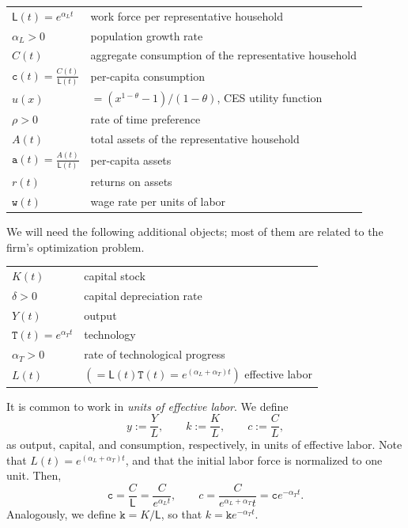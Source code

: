 \documentclass[10pt]{article}
\begin{document}
\smallskip

\begin{tabular}{ll}
$\mathsf{L}(t) = e^{\alpha_L t}$ & work force per representative household\\
$\alpha_L>0$ & population growth rate \\
$C(t)$ & aggregate consumption of the representative household\\
$\mathtt{c}(t)=\frac{C(t)}{\mathsf{L}(t)}$ & per-capita consumption\\
$u(x)$ & $=(x^{1-\theta}-1)/(1-\theta)$, CES utility function \\
$\rho>0$ & rate of time preference \\
$A(t)$ & total assets of the representative household\\
$\mathtt{a}(t) = \frac{A(t)}{\mathsf{L}(t)}$ & per-capita assets \\
$r(t)$ & returns on assets \\
$\mathtt{w}(t)$ & wage rate per units of labor
\end{tabular}

\smallskip

We will need the following additional objects; most of them are related to the firm's optimization problem.

\smallskip

\begin{tabular}{ll}
$K(t)$ & capital stock \\
$\delta > 0$ & capital depreciation rate \\
$Y(t)$ & output \\
$\mathtt{T}(t) = e^{\alpha_T t}$ & technology\\
$\alpha_T>0$ & rate of technological progress \\
$L(t)$ & $(=\mathsf{L}(t)\mathtt{T}(t)=e^{(\alpha_L + \alpha_T) t})$ effective labor
\end{tabular}

\smallskip

It is common to work in \textit{units of effective labor}.  We define
\[
y := \frac{Y}{L},\qquad k:= \frac{K}{L},\qquad c:=\frac{C}{L},
\]
as output, capital, and consumption, respectively, in units of effective labor. Note that $L(t) = e^{(\alpha_L + \alpha_T)t} $, and that the initial labor force is normalized to one unit.  Then,
\[
\mathtt{c} = \frac{C}{\mathsf{L}} = \frac{C}{e^{\alpha_L t}},\qquad c = \frac{C}{e^{\alpha_L + \alpha_T} t} = \mathtt{c}e^{-\alpha_T t}.
\]
Analogously, we define $\mathtt{k}=K/\mathsf{L}$, so that $k=\mathtt{k}e^{-\alpha_T t}$.
\end{document}
